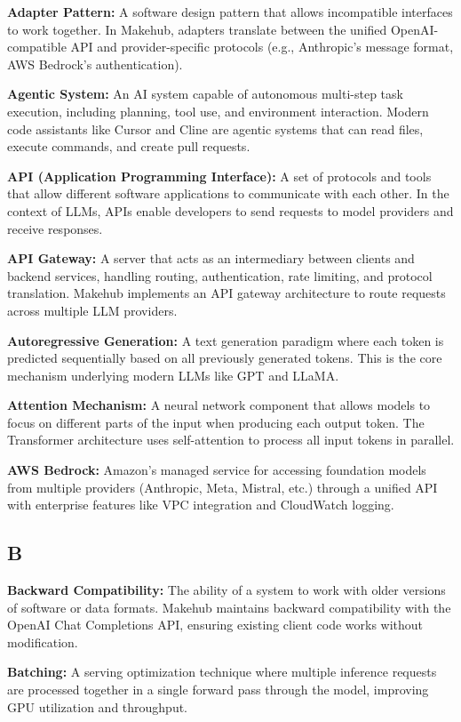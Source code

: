 \documentclass[english]{article}
\begin{document}
\textbf{Adapter Pattern:} A software design pattern that allows incompatible interfaces to work together. In Makehub, adapters translate between the unified OpenAI-compatible API and provider-specific protocols (e.g., Anthropic's message format, AWS Bedrock's authentication).

\textbf{Agentic System:} An AI system capable of autonomous multi-step task execution, including planning, tool use, and environment interaction. Modern code assistants like Cursor and Cline are agentic systems that can read files, execute commands, and create pull requests.

\textbf{API (Application Programming Interface):} A set of protocols and tools that allow different software applications to communicate with each other. In the context of LLMs, APIs enable developers to send requests to model providers and receive responses.

\textbf{API Gateway:} A server that acts as an intermediary between clients and backend services, handling routing, authentication, rate limiting, and protocol translation. Makehub implements an API gateway architecture to route requests across multiple LLM providers.

\textbf{Autoregressive Generation:} A text generation paradigm where each token is predicted sequentially based on all previously generated tokens. This is the core mechanism underlying modern LLMs like GPT and LLaMA.

\textbf{Attention Mechanism:} A neural network component that allows models to focus on different parts of the input when producing each output token. The Transformer architecture uses self-attention to process all input tokens in parallel.

\textbf{AWS Bedrock:} Amazon's managed service for accessing foundation models from multiple providers (Anthropic, Meta, Mistral, etc.) through a unified API with enterprise features like VPC integration and CloudWatch logging.

\subsection*{B}

\textbf{Backward Compatibility:} The ability of a system to work with older versions of software or data formats. Makehub maintains backward compatibility with the OpenAI Chat Completions API, ensuring existing client code works without modification.

\textbf{Batching:} A serving optimization technique where multiple inference requests are processed together in a single forward pass through the model, improving GPU utilization and throughput.
\end{document}
